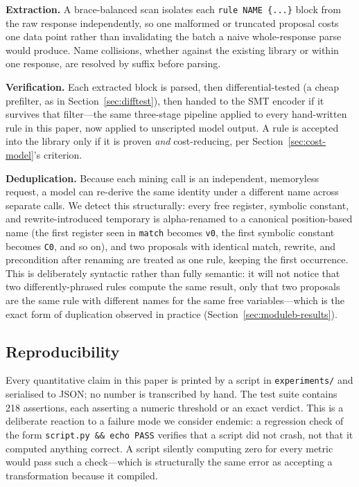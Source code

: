 \documentclass[conference]{IEEEtran}
\begin{document}
\textbf{Extraction.} A brace-balanced scan isolates each \texttt{rule NAME
\{...\}} block from the raw response independently, so one malformed or
truncated proposal costs one data point rather than invalidating the batch a
naive whole-response parse would produce. Name collisions, whether against the
existing library or within one response, are resolved by suffix before
parsing.

\textbf{Verification.} Each extracted block is parsed, then differential-tested
(a cheap prefilter, as in Section~\ref{sec:difftest}), then handed to the SMT
encoder if it survives that filter---the same three-stage pipeline applied to
every hand-written rule in this paper, now applied to unscripted model output.
A rule is accepted into the library only if it is proven \emph{and}
cost-reducing, per Section~\ref{sec:cost-model}'s criterion.

\textbf{Deduplication.} Because each mining call is an independent,
memoryless request, a model can re-derive the same identity under a different
name across separate calls. We detect this structurally: every free
register, symbolic constant, and rewrite-introduced temporary is
alpha-renamed to a canonical position-based name (the first register seen in
\texttt{match} becomes \texttt{v0}, the first symbolic constant becomes
\texttt{C0}, and so on), and two proposals with identical match, rewrite, and
precondition after renaming are treated as one rule, keeping the first
occurrence. This is deliberately syntactic rather than fully semantic: it
will not notice that two differently-phrased rules compute the same result,
only that two proposals are the same rule with different names for the same
free variables---which is the exact form of duplication observed in practice
(Section~\ref{sec:moduleb-results}).

\subsection{Reproducibility}

Every quantitative claim in this paper is printed by a script in
\texttt{experiments/} and serialised to JSON; no number is transcribed by hand.
The test suite contains 218 assertions, each asserting a numeric threshold or
an exact verdict. This is a deliberate reaction to a failure mode we consider
endemic: a regression check of the form \texttt{script.py \&\& echo PASS}
verifies that a script did not crash, not that it computed anything correct. A
script silently computing zero for every metric would pass such a check---which
is structurally the same error as accepting a transformation because it
compiled.
\end{document}
